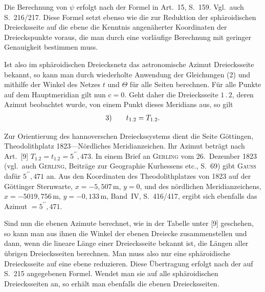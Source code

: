 \par\noindent\hspace*{\parindent}Die Berechnung von $\psi$ erfolgt nach der Formel in Art.~15, S.~159.
Vgl.~auch S.~216/217. Diese Formel setzt ebenso wie die zur Reduktion der
sphäroidischen Dreiecksseite auf die ebene die Kenntnis angenäherter
Koordinaten der Dreieckspunkte voraus, die man durch eine vorläufige
Berechnung mit geringer Genauigkeit bestimmen muss.

\par\noindent\hspace*{\parindent}Ist also im sphäroidischen Dreiecksnetz das astronomische Azimut
 Dreiecksseite bekannt, so kann man durch wiederholte
Anwendung der Gleichungen (2) und mithilfe der Winkel des Netzes $t$ und
$\Theta$ für alle Seiten berechnen. Für alle Punkte auf dem Hauptmeridian
gilt nun $\mathrm{c}=0$. Geht daher die Dreiecksseite $1\,.\,2$, deren
Azimut beobachtet wurde, von einem Punkt dieses Meridians aus, so gilt
\[
\begin{array}{r@{\qquad}c}
3)&t_{1.2}=T_{1.2}.
\end{array}
\]

\par\noindent\hspace*{\parindent}Zur Orientierung des hannoverschen Dreieckssystems dient die Seite
Göttingen, Theodolithplatz 1823---Nördliches Meridianzeichen. Ihr Azimut
beträgt nach Art.~[9] $T_{1.2}=t_{1.2}=5^{\prime\prime}{,}473$.
In einem Brief an \textsc{Gerling} vom 26.~Dezember 1823
(vgl.~auch \textsc{Gerling}, Beiträge zur Geographie Kurhessens etc., S.~69)
gibt \textsc{Gauss} dafür $5^{\prime\prime}{,}471$ an. Aus den Koordinaten
des Theodolithplatzes von 1823 auf der Göttinger Sternwarte,
$x=-5{,}507\,\mathrm{m}$, $y=0$, und des nördlichen Meridianzeichens,
$x=-5019{,}756\,\mathrm{m}$, $y=-0{,}133\,\mathrm{m}$, Band~IV, S.~416/417,
ergibt sich ebenfalls das Azimut $=5^{\prime\prime}{,}471$.

\par\noindent\hspace*{\parindent}Sind nun die ebenen Azimute berechnet, wie in der Tabelle unter [9]
geschehen, so kann man aus ihnen die Winkel der ebenen Dreiecke
zusammenstellen und dann, wenn die lineare Länge einer Dreiecksseite
bekannt ist, die Längen aller übrigen Dreiecksseiten berechnen. Man muss
also nur  eine sphäroidische Dreiecksseite auf eine ebene
reduzieren. Diese Übertragung erfolgt nach der auf S.~215 angegebenen
Formel. Wendet man sie auf alle sphäroidischen Dreiecksseiten an, so
erhält man ebenfalls die ebenen Dreiecksseiten.

